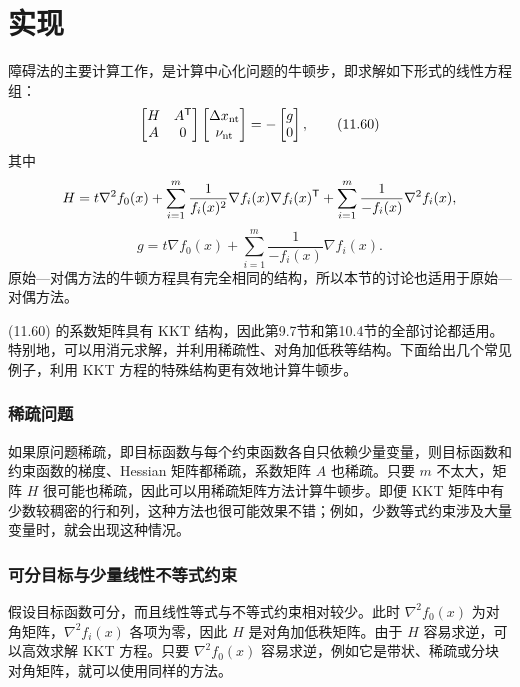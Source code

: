 \section{实现}
障碍法的主要计算工作，是计算中心化问题的牛顿步，即求解如下形式的线性方程组：
\begin{equation}
\begin{bmatrix}H&A^\mathsf T\\A&0\end{bmatrix}
\begin{bmatrix}\Delta x_{\mathrm{nt}}\\\nu_{\mathrm{nt}}\end{bmatrix}
=-\begin{bmatrix}g\\0\end{bmatrix},\tag{11.60}
\end{equation}
其中
\[
H=t\nabla^2 f_0(x)+\sum_{i=1}^m\frac1{f_i(x)^2}\nabla f_i(x)\nabla f_i(x)^\mathsf T
+\sum_{i=1}^m\frac1{-f_i(x)}\nabla^2 f_i(x),
\]
\[
g=t\nabla f_0(x)+\sum_{i=1}^m\frac1{-f_i(x)}\nabla f_i(x).
\]
原始—对偶方法的牛顿方程具有完全相同的结构，所以本节的讨论也适用于原始—对偶方法。

(11.60) 的系数矩阵具有 KKT 结构，因此第9.7节和第10.4节的全部讨论都适用。特别地，可以用消元求解，并利用稀疏性、对角加低秩等结构。下面给出几个常见例子，利用 KKT 方程的特殊结构更有效地计算牛顿步。

\subsubsection*{稀疏问题}
如果原问题稀疏，即目标函数与每个约束函数各自只依赖少量变量，则目标函数和约束函数的梯度、Hessian 矩阵都稀疏，系数矩阵 $A$ 也稀疏。只要 $m$ 不太大，矩阵 $H$ 很可能也稀疏，因此可以用稀疏矩阵方法计算牛顿步。即便 KKT 矩阵中有少数较稠密的行和列，这种方法也很可能效果不错；例如，少数等式约束涉及大量变量时，就会出现这种情况。

\subsubsection*{可分目标与少量线性不等式约束}
假设目标函数可分，而且线性等式与不等式约束相对较少。此时 $\nabla^2 f_0(x)$ 为对角矩阵，$\nabla^2 f_i(x)$ 各项为零，因此 $H$ 是对角加低秩矩阵。由于 $H$ 容易求逆，可以高效求解 KKT 方程。只要 $\nabla^2 f_0(x)$ 容易求逆，例如它是带状、稀疏或分块对角矩阵，就可以使用同样的方法。

